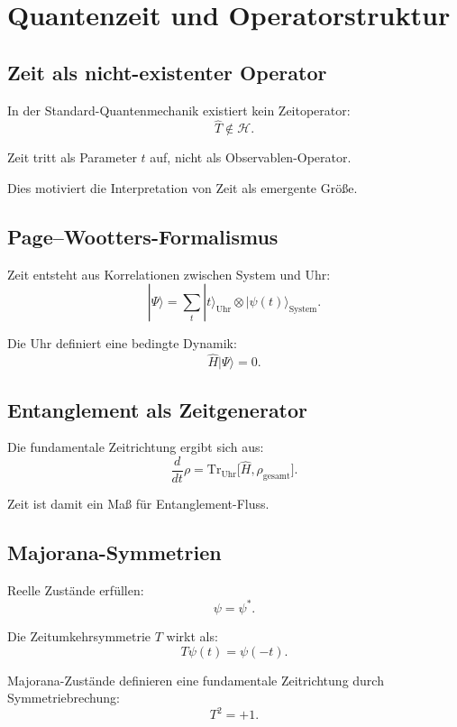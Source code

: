 
\section{Quantenzeit und Operatorstruktur}

\subsection{Zeit als nicht-existenter Operator}

In der Standard-Quantenmechanik existiert kein Zeitoperator:
\[
\hat{T} \notin \mathcal{H}.
\]

Zeit tritt als Parameter $t$ auf, nicht als Observablen-Operator.

Dies motiviert die Interpretation von Zeit als emergente Größe.

\subsection{Page--Wootters-Formalismus}

Zeit entsteht aus Korrelationen zwischen System und Uhr:
\[
|\Psi\rangle = \sum_t |t\rangle_{\text{Uhr}} \otimes |\psi(t)\rangle_{\text{System}}.
\]

Die Uhr definiert eine bedingte Dynamik:
\[
\hat{H} |\Psi\rangle = 0.
\]

\subsection{Entanglement als Zeitgenerator}

Die fundamentale Zeitrichtung ergibt sich aus:
\[
\frac{d}{dt} \rho = \text{Tr}_{\text{Uhr}} \big[ \hat{H}, \rho_{\text{gesamt}} \big].
\]

Zeit ist damit ein Maß für Entanglement-Fluss.

\subsection{Majorana-Symmetrien}

Reelle Zustände erfüllen:
\[
\psi = \psi^*.
\]

Die Zeitumkehrsymmetrie $T$ wirkt als:
\[
T \psi(t) = \psi(-t).
\]

Majorana-Zustände definieren eine fundamentale Zeitrichtung durch
Symmetriebrechung:
\[
T^2 = +1.
\]

